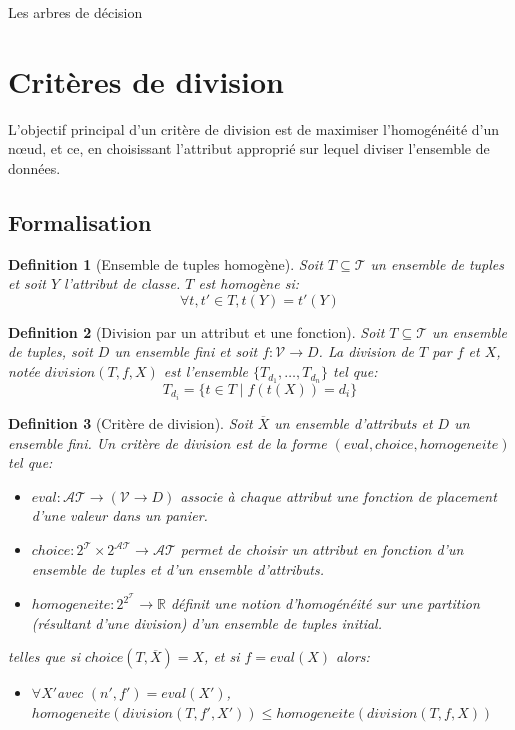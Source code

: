 \documentclass[a4paper, 11pt]{report}
\newtheorem{definition}{Definition}
\newcommand{\set}[1]{\ensuremath{\overline{#1}}}
\newcommand{\tupleset}{\ensuremath{\mathcal{T}}}
\newcommand{\attributset}{\ensuremath{\mathcal{AT}}}
\newcommand{\valeurset}{\ensuremath{\mathcal{V}}}
\newcommand{\real}{\ensuremath{\mathbb{R}}}
\begin{document}
\begin{chapter}{Les arbres de décision}
\section{Critères de division}
L'objectif principal d'un critère de division est de maximiser l'homogénéité d'un nœud, et ce, en choisissant l'attribut approprié sur lequel diviser l'ensemble de données.\\
\subsection{Formalisation}
\begin{definition}[Ensemble de tuples homogène]
  Soit $T\subseteq\tupleset$ un ensemble de tuples et soit $Y$ l'attribut de classe.
$T$ est \emph{homogène} si:
$$\forall t, t'\in T, t(Y)=t'(Y)$$

\end{definition}

\begin{definition}[Division par un attribut et une fonction]
  Soit $T\subseteq\tupleset$ un ensemble de tuples, soit $D$ un ensemble fini et soit $f: \valeurset\rightarrow D$.
  La division de $T$ par $f$ et $X$, notée $division(T,f,X)$ est l'ensemble $\{T_{d_1},\dots,T_{d_n}\}$ tel que:
$$T_{d_i} = \{ t\in T \mid f(t(X)) = d_i \}$$
\end{definition}

\begin{definition}[Critère de division]
Soit $\set{X}$ un ensemble d'attributs et $D$ un ensemble fini.
Un critère de division est de la forme $(eval,choice,homogeneite)$ tel que:
\begin{itemize}
\item $eval: \attributset\rightarrow (\valeurset\rightarrow D)$ associe à chaque attribut une fonction de placement d'une valeur dans un panier.
\item $choice: 2^\tupleset\times 2^\attributset \rightarrow \attributset$ permet de choisir un attribut en fonction d'un ensemble de tuples et d'un ensemble d'attributs.
\item $homogeneite: 2^{2^\tupleset}\rightarrow\real$ définit une notion d'homogénéité sur une partition (résultant d'une division) d'un ensemble de tuples initial.
\end{itemize}
telles que si $choice(T,\set{X}) = X$, et si $f = eval(X)$  alors:
\begin{itemize}
\item $\forall X' $avec $(n',f')=eval(X')$, $homogeneite(division(T,f',X')) \leq homogeneite(division(T,f,X))$
\end{itemize}


\end{definition}
\end{chapter}
\end{document}
